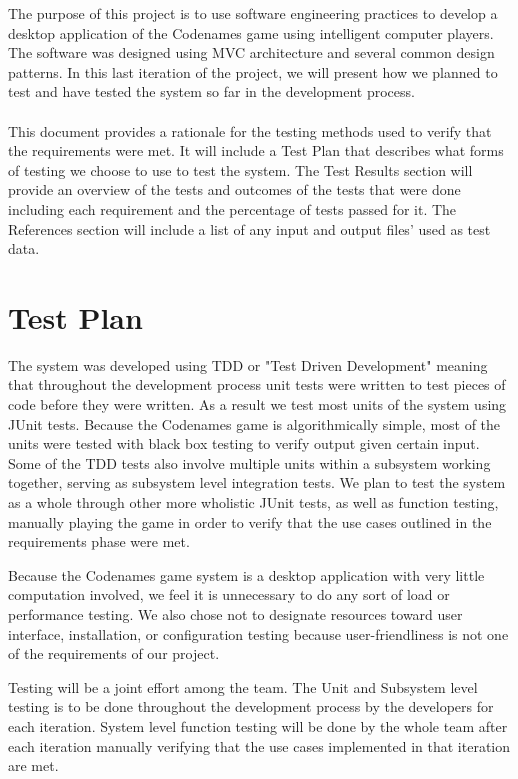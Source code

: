 \documentclass[12pt]{article}
\begin{document}
The purpose of this project is to use software engineering practices to develop a desktop application of the Codenames game using intelligent computer players. The software was designed using MVC architecture and several common design patterns. In this last iteration of the project, we will present how we planned to test and have tested the system so far in the development process.
\\
\\
This document provides a rationale for the testing methods used to verify that the requirements were met. It will include a Test Plan that describes what forms of testing we choose to use to test the system. The Test Results section will provide an overview of the tests and outcomes of the tests that were done including each requirement and the percentage of tests passed for it. The References section will include a list of any input and output files' used as test data.


\section{Test Plan}

The system was developed using TDD or "Test Driven Development" meaning that throughout the development process unit tests were written to test pieces of code before they were written. As a result we test most units of the system using JUnit tests. Because the Codenames game is algorithmically simple, most of the units were tested with black box testing to verify output given certain input. Some of the TDD tests also involve multiple units within a subsystem working together, serving as subsystem level integration tests. We plan to test the system as a whole through other more wholistic JUnit tests, as well as function testing, manually playing the game in order to verify that the use cases outlined in the requirements phase were met. \newline

Because the Codenames game system is a desktop application with very little computation involved, we feel it is unnecessary to do any sort of load or performance testing. We also chose not to designate resources toward user interface, installation, or configuration testing because user-friendliness is not one of the requirements of our project. \newline

Testing will be a joint effort among the team. The Unit and Subsystem level testing is to be done throughout the development process by the developers for each iteration. System level function testing will be done by the whole team after each iteration manually verifying that the use cases implemented in that iteration are met. \newline
\end{document}
